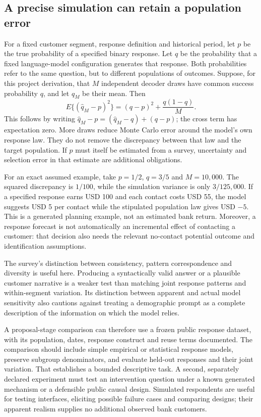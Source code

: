 \subsection{A precise simulation can retain a population error}
\label{exec20:pa-population}
For a fixed customer segment, response definition and historical period, let
$p$ be the true probability of a specified binary response. Let $q$ be the
probability that a fixed language-model configuration generates that response.
Both probabilities refer to the same question, but to different populations
of outcomes. Suppose, for this project derivation, that $M$ independent
decoder draws have common success probability $q$, and let $\widehat q_M$
be their mean. Then
\begin{equation}
 E\{(\widehat q_M-p)^2\}
   =(q-p)^2+\frac{q(1-q)}{M}.
 \label{exec20:pa-mse}
\end{equation}
This follows by writing $\widehat q_M-p=(\widehat q_M-q)+(q-p)$;
the cross term has expectation zero. More draws reduce Monte Carlo error
around the model's own response law. They do not remove the discrepancy
between that law and the target population. If $p$ must itself be estimated
from a survey, uncertainty and selection error in that estimate are additional
obligations.\citep{exec20_population_attribution_reference}

For an exact assumed example, take $p=1/2$, $q=3/5$ and $M=10{,}000$.
The squared discrepancy is $1/100$, while the simulation variance is only
$3/125{,}000$. If a specified response earns USD 100 and each contact costs
USD 55, the model suggests USD 5 per contact while the stipulated population
law gives USD $-5$. This is a generated planning example, not an estimated
bank return. Moreover, a response forecast is not automatically an incremental
effect of contacting a customer: that decision also needs the relevant
no-contact potential outcome and identification assumptions.
\citep{exec20_population_attribution_reference}

The survey's distinction between consistency, pattern correspondence and
diversity is useful here. Producing a syntactically valid answer or a plausible
customer narrative is a weaker test than matching joint response patterns and
within-segment variation. Its distinction between apparent and actual model
sensitivity also cautions against treating a demographic prompt as a complete
description of the information on which the model relies.
\citep{exec20_population}

A proposal-stage comparison can therefore use a frozen public response
dataset, with its population, dates, response construct and reuse terms
documented. The comparison should include simple empirical or statistical
response models, preserve subgroup denominators, and evaluate held-out
responses and their joint variation. That establishes a bounded descriptive
task. A second, separately declared experiment must test an intervention
question under a known generated mechanism or a defensible public causal
design. Simulated respondents are useful for testing interfaces, eliciting
possible failure cases and comparing designs; their apparent realism supplies
no additional observed bank customers.

